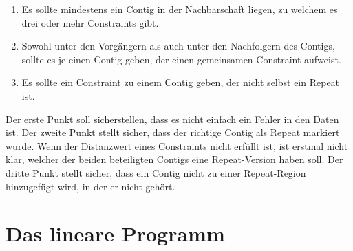 \begin{enumerate}
\item Es sollte mindestens ein Contig in der Nachbarschaft liegen, zu welchem es drei oder mehr Constraints gibt.
\item Sowohl unter den Vorgängern als auch unter den Nachfolgern des Contigs, sollte es je einen Contig geben, der einen gemeinsamen Constraint aufweist.
\item Es sollte ein Constraint zu einem Contig geben, der nicht selbst ein Repeat ist.
\end{enumerate}
Der erste Punkt soll sicherstellen, dass es nicht einfach ein Fehler in den Daten ist. Der zweite Punkt stellt sicher, dass der richtige Contig als Repeat markiert wurde. Wenn der Distanzwert eines Constraints nicht erfüllt ist, ist erstmal nicht klar, welcher der beiden beteiligten Contigs eine Repeat-Version haben soll. Der dritte Punkt stellt sicher, dass ein Contig nicht zu einer Repeat-Region hinzugefügt wird, in der er nicht gehört.

\section{Das lineare Programm}
